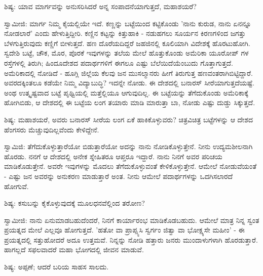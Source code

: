 ಶಿಷ್ಯ: ಯಾವ ಮಾರ್ಗವನ್ನು ಅನುಸರಿಸಿದರೆ ಅನ್ನ ಸಂಪಾದನೆಯಾಗುತ್ತದೆ, ಮಹಾಶಯರೆ?

ಸ್ವಾಮೀಜಿ: ಮಾರ್ಗ ನಿಮ್ಮ ಕೈಯಲ್ಲಿಯೇ ಇದೆ. ಕಣ್ಣನ್ನು ಬಟ್ಟೆಯಿಂದ ಕಟ್ಟಿಕೊಂಡು 'ನಾನು ಕುರುಡ, ನಾನು ಏನನ್ನೂ ನೋಡಲಾರೆ' ಎಂದು ಹೇಳುತ್ತಿದ್ದೀರಿ. ಕಣ್ಣಿನ ಕಟ್ಟನ್ನು ಕಿತ್ತುಹಾಕಿ - ನಡುಹಗಲು ಸೂರ್ಯನ ಕಿರಣಗಳಿಂದ ಜಗತ್ತು ಬೆಳಗುತ್ತಿರುವುದು ಕಣ್ಣಿಗೆ ಬೀಳುತ್ತದೆ. ಹಣ ದೊರೆಯದಿದ್ದರೆ ಜಹಜಿನಲ್ಲಿ ಕೂಲಿಯಾಗಿ ವಿದೇಶಕ್ಕೆ ಹೊರಟುಹೋಗಿ. ಸ್ವದೇಶಿ ಬಟ್ಟೆ, ಚೌಕ, ಮೊರ, ಪೊರಕೆ ಇವುಗಳನ್ನು ತಲೆಯ ಮೇಲೆ ಹೊತ್ತುಕೊಂಡು ಅಮೆರಿಕಾ ಯೂರೋಪ್ ಗಳ ರಸ್ತೆಗಳಲ್ಲಿ ತಿರುಗಿ; ಹಿಂದೂದೇಶದ ಪದಾರ್ಥಗಳಿಗೆ ಈಗಲೂ ಎಷ್ಟು ಬೆಲೆಯಿದೆಯೆಂಬುದು ಗೊತ್ತಾಗುತ್ತದೆ. ಅಮೆರಿಕಾದಲ್ಲಿ ನೋಡಿದೆ - ಹೂಗ್ಲಿ ಜಿಲ್ಲೆಯ ಕೆಲವು ಜನ ಮುಸಲ್ಮಾನರು ಹೀಗೆ ತಿರುಗುತ್ತ ಹಣವಂತರಾಗಿಬಿಟ್ಟಿದ್ದಾರೆ. ಅವರದಕ್ಕಿಂತಲೂ ಕಡೆಯೇ ನಿಮ್ಮ ವಿದ್ಯಾಬುದ್ಧಿ? ಇದನ್ನೇ ನೋಡು. ಈ ದೇಶದಲ್ಲಿ ಬನಾರಸ್ ಸೀರೆಯಾಗುತ್ತದೆಯಷ್ಟೆ. ಅಂಥ ಉತ್ಕೃಷ್ಟವಾದ ಬಟ್ಟೆ ಪೃಥ್ವಿಯಲ್ಲಿ ಮತ್ತೆಲ್ಲಿಯೂ ಆಗುವುದಿಲ್ಲ. ಈ ಬಟ್ಟೆಯನ್ನು ತೆಗೆದುಕೊಂಡು ಅಮೆರಿಕಾಕ್ಕೆ ಹೋಗಿಬಿಡು, ಆ ದೇಶದಲ್ಲಿ ಈ ಬಟ್ಟೆಯ ಲಂಗ ತಯಾರು ಮಾಡಿ ಮಾರುತ್ತಾ ಬಾ, ನೋಡು ಎಷ್ಟು ದುಡ್ಡು ಸಿಕ್ಕುತ್ತದೆ.

ಶಿಷ್ಯ: ಮಹಾಶಯರೆ, ಅವರು ಬನಾರಸ್ ಸೀರೆಯ ಲಂಗ ಏಕೆ ಹಾಕಿಕೊಳ್ಳುವರು? ಚಿತ್ರವಿಚಿತ್ರ ಬಟ್ಟೆಗಳನ್ನು ಆ ದೇಶದ ಹೆಂಗಸರು ಮೆಚ್ಚುವುದಿಲ್ಲವೆಂದು ಕೇಳಿದ್ದೇನೆ.

ಸ್ವಾಮಿಜಿ: ತೆಗೆದುಕೊಳ್ಳುತ್ತಾರೆಯೋ ಬಿಡುತ್ತಾರೆಯೋ ಅದನ್ನು ನಾನು ನೋಡಿಕೊಳ್ಳುತ್ತೇನೆ. ನೀನು ಉದ್ಯಮಶೀಲನಾಗಿ ಹೊರಡು. ನನಗೆ ಆ ದೇಶದಲ್ಲಿ ಅನೇಕ ಸ್ನೇಹಿತರೂ ಆಪ್ತರೂ ಇದ್ದಾರೆ. ನಾನು ನಿನಗೆ ಅವರ ಪರಿಚಯ ಮಾಡಿಕೊಡುತ್ತೇನೆ. ಅವರೇ ಇವುಗಳನ್ನು ಮೊದಲು ತೆಗೆದುಕೊಳ್ಳುವಂತೆ ಕೇಳಿಕೊಳ್ಳುತ್ತೇನೆ. ಆಮೇಲೆ ನೋಡುವೆಯಂತೆ - ಎಷ್ಟು ಜನ ಅವರನ್ನು ಅನುಕರಣ ಮಾಡುತ್ತಾರೆ ಅಂತ. ನೀನು ಆಮೇಲೆ ಪದಾರ್ಥಗಳನ್ನು ಒದಗಿಸಲಾರದೆ ಹೋಗುವೆ.

ಶಿಷ್ಯ: ಕಸುಬನ್ನು ಕೈಕೊಳ್ಳುವುದಕ್ಕೆ ಮೂಲಧನವೆಲ್ಲಿಂದ ತರೋಣ?

ಸ್ವಾಮೀಜಿ: ನಾನು ಏನುಮಾಡಬಹುದೆಂದರೆ, ನಿನಗೆ ಕಾರ್ಯಾರಂಭ ಮಾಡಿಕೊಡಬಹುದು. ಆಮೇಲೆ ಮಾತ್ರ ನಿನ್ನ ಸ್ವಂತ ಪ್ರಯತ್ನದ ಮೇಲೆ ಎಲ್ಲವೂ ಹೋಗುತ್ತದೆ. 'ಹತೋ ವಾ ಪ್ರಾಪ್ಸ್ಯಸಿ ಸ್ವರ್ಗಂ ಜಿತ್ವಾ ವಾ ಭೋಕ್ಷ್ಯಸೇ ಮಹೀಂ' - ಈ ಪ್ರಯತ್ನದಲ್ಲಿ ಸತ್ತುಹೋದರೆ ಅದೂ ಉತ್ತಮವೆ. ನಿನ್ನನ್ನು ನೋಡಿ ಹತ್ತಾರು ಜನರು ಮುಂದಾಳುಗಳಾಗಿ ಹೊರಡುತ್ತಾರೆ. ಹಾಗಲ್ಲದೆ ಸಫಲವಾದರೆ ಮಹಾ ಭೋಗದಲ್ಲಿ ಜೀವನ ಮಾಡುವೆ.

ಶಿಷ್ಯ: ಅಪ್ಪಣೆ; ಆದರೆ ಬರಿಯ ಸಾಹಸ ಸಾಲದು.

